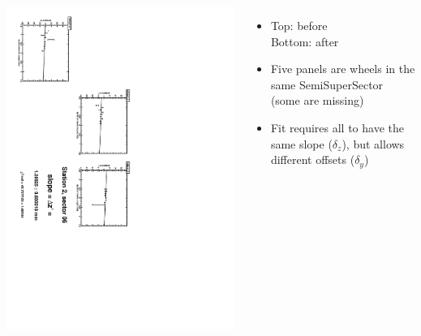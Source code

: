 \documentclass[compress]{beamer}
\begin{document}
\begin{frame}
\begin{columns}
\vfill
\includegraphics[height=\linewidth, angle=90]{zfits_after/zfit_2_06.pdf}
\begin{itemize}
\item Top: before \\ Bottom: after
\item Five panels are wheels in the same SemiSuperSector (some are missing)
\item Fit requires all to have the same slope ($\delta_z$), but allows different offsets ($\delta_y$)
\end{itemize}
\end{columns}
\end{frame}
\end{document}
